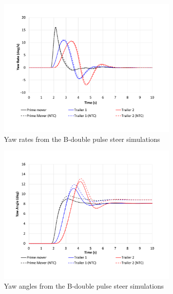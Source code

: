     \begin{figure}[H]
        \centering
        \includegraphics[width=0.8\textwidth]{fig/ntc-b-double_psg}
        \caption{Yaw rates from the B-double pulse steer simulations}
        \label{figure:ntc-b-double_psg}
    \end{figure}

    \begin{figure}[H]
        \centering
        \includegraphics[width=0.8\textwidth]{fig/ntc-b-double_psh}
        \caption{Yaw angles from the B-double pulse steer simulations}
        \label{figure:ntc-b-double_psh}
    \end{figure}

